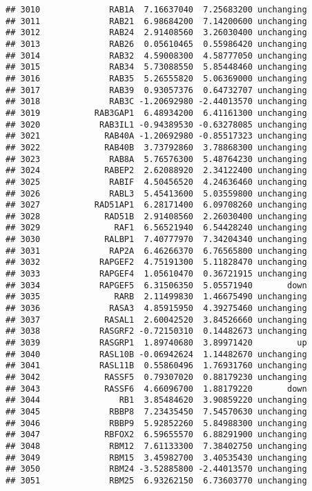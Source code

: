 \documentclass[]{article}
\begin{document}
\begin{verbatim}
## 3010              RAB1A  7.16637040  7.25683200 unchanging
## 3011              RAB21  6.98684200  7.14200600 unchanging
## 3012              RAB24  2.91408560  3.26030400 unchanging
## 3013              RAB26  0.05610465  0.55986420 unchanging
## 3014              RAB32  4.59008300  4.58777050 unchanging
## 3015              RAB34  5.73088550  5.85448460 unchanging
## 3016              RAB35  5.26555820  5.06369000 unchanging
## 3017              RAB39  0.93057376  0.64732707 unchanging
## 3018              RAB3C -1.20692980 -2.44013570 unchanging
## 3019           RAB3GAP1  6.48934200  6.41161300 unchanging
## 3020            RAB3IL1 -0.94389530 -0.63278085 unchanging
## 3021             RAB40A -1.20692980 -0.85517323 unchanging
## 3022             RAB40B  3.73792860  3.78868300 unchanging
## 3023              RAB8A  5.76576300  5.48764230 unchanging
## 3024             RABEP2  2.62088920  2.34122400 unchanging
## 3025              RABIF  4.50456520  4.24636460 unchanging
## 3026              RABL3  5.45413600  5.03559800 unchanging
## 3027           RAD51AP1  6.28171400  6.09708260 unchanging
## 3028             RAD51B  2.91408560  2.26030400 unchanging
## 3029               RAF1  6.56521940  6.54428240 unchanging
## 3030             RALBP1  7.40777970  7.34204340 unchanging
## 3031              RAP2A  6.46266370  6.76565800 unchanging
## 3032            RAPGEF2  4.75191300  5.11828470 unchanging
## 3033            RAPGEF4  1.05610470  0.36721915 unchanging
## 3034            RAPGEF5  6.31506350  5.05571940       down
## 3035               RARB  2.11499830  1.46675490 unchanging
## 3036              RASA3  4.85915950  4.39275460 unchanging
## 3037             RASAL1  2.60042520  3.84526660 unchanging
## 3038            RASGRF2 -0.72150310  0.14482673 unchanging
## 3039            RASGRP1  1.89740680  3.89971420         up
## 3040            RASL10B -0.06942624  1.14482670 unchanging
## 3041            RASL11B  0.55860496  1.76931760 unchanging
## 3042             RASSF5  0.79307020  0.88179230 unchanging
## 3043             RASSF6  4.66096700  1.88179220       down
## 3044                RB1  3.85484620  3.90859220 unchanging
## 3045              RBBP8  7.23435450  7.54570630 unchanging
## 3046              RBBP9  5.92852260  5.84988300 unchanging
## 3047             RBFOX2  6.59655570  6.88291900 unchanging
## 3048              RBM12  7.61133300  7.38402750 unchanging
## 3049              RBM15  3.45982700  3.40535430 unchanging
## 3050              RBM24 -3.52885800 -2.44013570 unchanging
## 3051              RBM25  6.93262150  6.73603770 unchanging

\end{verbatim}
\end{document}
